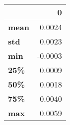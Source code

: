 \begin{tabular}{lr}
\toprule
{} &       0 \\
\midrule
\textbf{mean} &  0.0024 \\
\textbf{std } &  0.0023 \\
\textbf{min } & -0.0003 \\
\textbf{25\% } &  0.0009 \\
\textbf{50\% } &  0.0018 \\
\textbf{75\% } &  0.0040 \\
\textbf{max } &  0.0059 \\
\bottomrule
\end{tabular}
